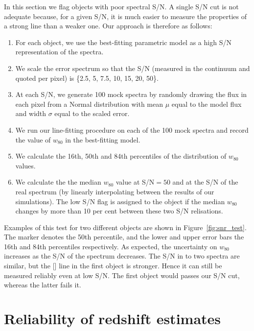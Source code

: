 In this section we flag objects with poor spectral \ac{S/N}. 
A single \ac{S/N} cut is not adequate because, for a given \ac{S/N}, it is much easier to measure the properties of a strong line than a weaker one. 
Our approach is therefore as follows:

\begin{enumerate}
\item For each object, we use the best-fitting parametric model as a high \ac{S/N} representation of the spectra. 
\item We scale the error spectrum so that the \ac{S/N} (measured in the continuum and quoted per pixel) is \{2.5, 5, 7.5, 10, 15, 20, 50\}.
\item At each \ac{S/N}, we generate 100 mock spectra by randomly drawing the flux in each pixel from a Normal distribution with mean $\mu$ equal to the model flux and width $\sigma$ equal to the scaled error. 
\item We run our line-fitting procedure on each of the 100 mock spectra and record the value of $w_{80}$ in the best-fitting model. 
\item We calculate the 16th, 50th and 84th percentiles of the distribution of $w_{80}$ values.
\item We calculate the the median $w_{80}$ value at \ac{S/N}$=50$ and at the \ac{S/N} of the real spectrum (by linearly interpolating between the results of our simulations). The low \ac{S/N} flag is assigned to the object if the median $w_{80}$ changes by more than 10 per cent between these two \ac{S/N} relisations. 
\end{enumerate}

Examples of this test for two different objects are shown in Figure~\ref{fig:snr_test}.
The marker denotes the 50th percentile, and the lower and upper error bars the 16th and 84th percentiles respectively. 
As expected, the uncertainty on $w_{80}$ increases as the \ac{S/N} of the spectrum decreases. 
The \ac{S/N} in to two spectra are similar, but the [] line in the  first object is stronger. 
Hence it can still be measured reliably even at low \ac{S/N}. 
The first object would passes our \ac{S/N} cut, whereas the latter fails it. 

\section{Reliability of redshift estimates}

